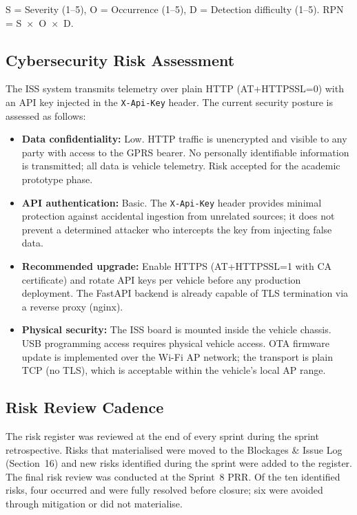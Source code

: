 \noindent S = Severity (1--5), O = Occurrence (1--5), D = Detection difficulty (1--5). RPN = S~$\times$~O~$\times$~D.

\subsection{Cybersecurity Risk Assessment}

The ISS system transmits telemetry over plain HTTP (AT+HTTPSSL=0) with an API key injected in the \texttt{X-Api-Key} header. The current security posture is assessed as follows:

\begin{itemize}
    \item \textbf{Data confidentiality:} Low. HTTP traffic is unencrypted and visible to any party with access to the GPRS bearer. No personally identifiable information is transmitted; all data is vehicle telemetry. Risk accepted for the academic prototype phase.
    \item \textbf{API authentication:} Basic. The \texttt{X-Api-Key} header provides minimal protection against accidental ingestion from unrelated sources; it does not prevent a determined attacker who intercepts the key from injecting false data.
    \item \textbf{Recommended upgrade:} Enable HTTPS (AT+HTTPSSL=1 with CA certificate) and rotate API keys per vehicle before any production deployment. The FastAPI backend is already capable of TLS termination via a reverse proxy (nginx).
    \item \textbf{Physical security:} The ISS board is mounted inside the vehicle chassis. USB programming access requires physical vehicle access. OTA firmware update is implemented over the Wi-Fi AP network; the transport is plain TCP (no TLS), which is acceptable within the vehicle's local AP range.
\end{itemize}

\clearpage
\subsection{Risk Review Cadence}

The risk register was reviewed at the end of every sprint during the sprint retrospective. Risks that materialised were moved to the Blockages \& Issue Log (Section~16) and new risks identified during the sprint were added to the register. The final risk review was conducted at the Sprint~8 PRR. Of the ten identified risks, four occurred and were fully resolved before closure; six were avoided through mitigation or did not materialise.
